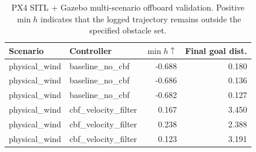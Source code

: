 \begin{table}[t]
\caption{PX4 SITL + Gazebo multi-scenario offboard validation. Positive $\min h$ indicates that the logged trajectory remains outside the specified obstacle set.}
\label{tab:px4_multiscenario}
\centering
\begin{tabular}{llrr}
\toprule
Scenario & Controller & $\min h \uparrow$ & Final goal dist. \\
\midrule
physical\_wind & baseline\_no\_cbf & -0.688 & 0.180 \\
physical\_wind & baseline\_no\_cbf & -0.686 & 0.136 \\
physical\_wind & baseline\_no\_cbf & -0.682 & 0.127 \\
physical\_wind & cbf\_velocity\_filter & 0.167 & 3.450 \\
physical\_wind & cbf\_velocity\_filter & 0.238 & 2.388 \\
physical\_wind & cbf\_velocity\_filter & 0.123 & 3.191 \\
\bottomrule
\end{tabular}
\end{table}
